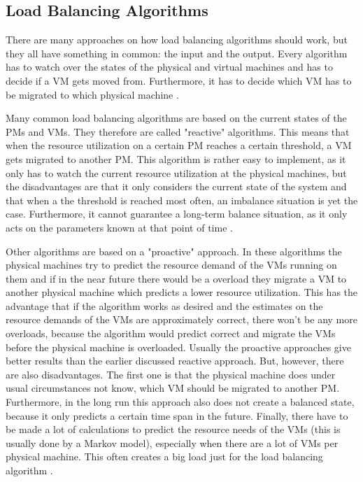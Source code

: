 \subsection{Load Balancing Algorithms}
There are many approaches on how load balancing algorithms should work, but they all have something in common: the input and the output. Every algorithm has to watch over the states of the physical and virtual machines and has to decide if a VM gets moved from. Furthermore, it has to decide which VM has to be migrated to which physical machine \cite{Chen_2014}.

Many common load balancing algorithms are based on the current states of the PMs and VMs. They therefore are called "reactive" algorithms. This means that when the resource utilization on a certain PM reaches a certain threshold, a VM gets migrated to another PM. This algorithm is rather easy to implement, as it only has to watch the current resource utilization at the physical machines, but the disadvantages are that it only considers the current state of the system and that when a the threshold is reached most often, an imbalance situation is yet the case. Furthermore, it cannot guarantee a long-term balance situation, as it only acts on the parameters known at that point of time \cite{Arzuaga_2010,Chen_2014}.

Other algorithms are based on a "proactive" approach. In these algorithms the physical machines try to predict the resource demand of the VMs running on them and if in the near future there would be a overload they migrate a VM to another physical machine which predicts a lower resource utilization. This has the advantage that if the algorithm works as desired and the estimates on the resource demands of the VMs are approximately correct, there won't be any more overloads, because the algorithm would predict correct and migrate the VMs before the physical machine is overloaded. Usually the proactive approaches give better results than the earlier discussed reactive approach. But, however, there are also disadvantages. The first one is that the physical machine does under usual circumstances not know, which VM should be migrated to another PM. Furthermore, in the long run this approach also does not create a balanced state, because it only predicts a certain time span in the future. Finally, there have to be made a lot of calculations to predict the resource needs of the VMs (this is usually done by a Markov model), especially when there are a lot of VMs per physical machine. This often creates a big load just for the load balancing algorithm \cite{Beloglazov_2013,Chen_2014}.

